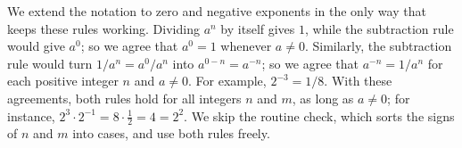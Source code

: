 We extend the notation to zero and negative exponents in the only way that keeps these rules working. Dividing $a^n$ by itself gives $1$, while the subtraction rule would give $a^0$; so we agree that $a^0=1$ whenever $a\ne0$. Similarly, the subtraction rule would turn $1/a^n=a^0/a^n$ into $a^{0-n}=a^{-n}$; so we agree that $a^{-n}=1/a^n$ for each positive integer $n$ and $a\ne0$. For example, $2^{-3}=1/8$. With these agreements, both rules hold for all integers $n$ and $m$, as long as $a\ne0$; for instance, $2^3\cdot2^{-1}=8\cdot\tfrac12=4=2^2$. We skip the routine check, which sorts the signs of $n$ and $m$ into cases, and use both rules freely.

